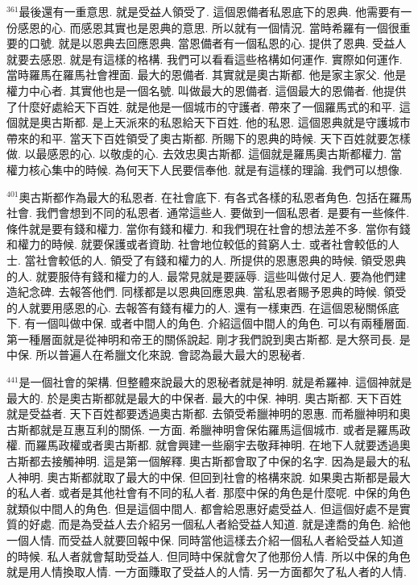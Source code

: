 \documentclass{book}
\begin{document}
$^{361}$最後還有一重意思.
就是受益人領受了.
這個恩備者私恩底下的恩典.
他需要有一份感恩的心.
而感恩其實也是恩典的意思.
所以就有一個情況.
當時希羅有一個很重要的口號.
就是以恩典去回應恩典.
當恩備者有一個私恩的心.
提供了恩典.
受益人就要去感恩.
就是有這樣的格構.
我們可以看看這些格構如何運作.
實際如何運作.
當時羅馬在羅馬社會裡面.
最大的恩備者.
其實就是奧古斯都.
他是家主家父.
他是權力中心者.
其實他也是一個名號.
叫做最大的恩備者.
這個最大的恩備者.
他提供了什麼好處給天下百姓.
就是他是一個城市的守護者.
帶來了一個羅馬式的和平.
這個就是奧古斯都.
是上天派來的私恩給天下百姓.
他的私恩.
這個恩典就是守護城市帶來的和平.
當天下百姓領受了奧古斯都.
所賜下的恩典的時候.
天下百姓就要怎樣做.
以最感恩的心.
以敬虔的心.
去效忠奧古斯都.
這個就是羅馬奧古斯都權力.
當權力核心集中的時候.
為何天下人民要信奉他.
就是有這樣的理論.
我們可以想像.

$^{401}$奧古斯都作為最大的私恩者.
在社會底下.
有各式各樣的私恩者角色.
包括在羅馬社會.
我們會想到不同的私恩者.
通常這些人.
要做到一個私恩者.
是要有一些條件.
條件就是要有錢和權力.
當你有錢和權力.
和我們現在社會的想法差不多.
當你有錢和權力的時候.
就要保護或者資助.
社會地位較低的貧窮人士.
或者社會較低的人士.
當社會較低的人.
領受了有錢和權力的人.
所提供的恩惠恩典的時候.
領受恩典的人.
就要服侍有錢和權力的人.
最常見就是要誣辱.
這些叫做付足人.
要為他們建造紀念碑.
去報答他們.
同樣都是以恩典回應恩典.
當私恩者賜予恩典的時候.
領受的人就要用感恩的心.
去報答有錢有權力的人.
還有一樣東西.
在這個恩秘關係底下.
有一個叫做中保.
或者中間人的角色.
介紹這個中間人的角色.
可以有兩種層面.
第一種層面就是從神明和帝王的關係說起.
剛才我們說到奧古斯都.
是大祭司長.
是中保.
所以普遍人在希臘文化來說.
會認為最大最大的恩秘者.

$^{441}$是一個社會的架構.
但整體來說最大的恩秘者就是神明.
就是希羅神.
這個神就是最大的.
於是奧古斯都就是最大的中保者.
最大的中保.
神明.
奧古斯都.
天下百姓就是受益者.
天下百姓都要透過奧古斯都.
去領受希臘神明的恩惠.
而希臘神明和奧古斯都就是互惠互利的關係.
一方面.
希臘神明會保佑羅馬這個城市.
或者是羅馬政權.
而羅馬政權或者奧古斯都.
就會興建一些廟宇去敬拜神明.
在地下人就要透過奧古斯都去接觸神明.
這是第一個解釋.
奧古斯都會取了中保的名字.
因為是最大的私人神明.
奧古斯都就取了最大的中保.
但回到社會的格構來說.
如果奧古斯都是最大的私人者.
或者是其他社會有不同的私人者.
那麼中保的角色是什麼呢.
中保的角色就類似中間人的角色.
但是這個中間人.
都會給恩惠好處受益人.
但這個好處不是實質的好處.
而是為受益人去介紹另一個私人者給受益人知道.
就是達喬的角色.
給他一個人情.
而受益人就要回報中保.
同時當他這樣去介紹一個私人者給受益人知道的時候.
私人者就會幫助受益人.
但同時中保就會欠了他那份人情.
所以中保的角色就是用人情換取人情.
一方面賺取了受益人的人情.
另一方面都欠了私人者的人情.
\end{document}
